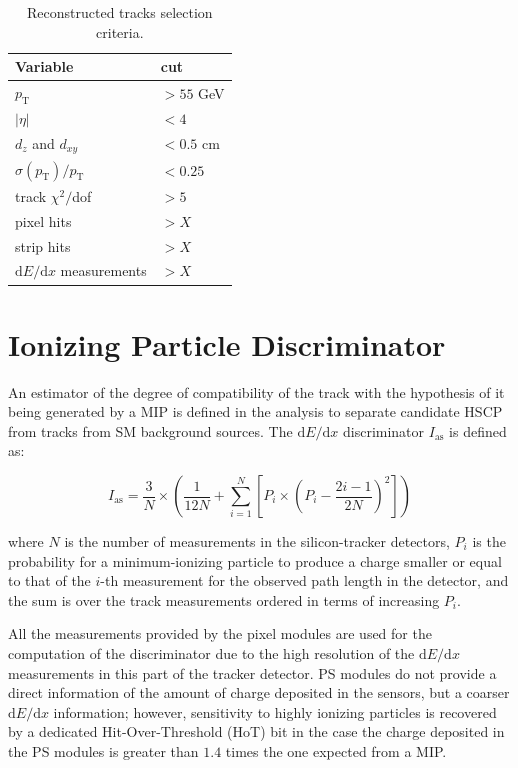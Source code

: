 \documentclass[11pt,oneside,a4paper]{article}
\begin{document}
\begin{table}
 \centering
 \caption{Reconstructed tracks selection criteria.\label{tab:selection}}
 \begin{tabular}{ll}
  \toprule
  Variable 			& cut \\ 
  \midrule	
  $p_{\mathrm{T}}$		& $> 55$ GeV \\
  $|\eta|$			& $< 4$ \\
  $d_z$ and $d_{xy}$		& $< 0.5$ cm \\
  $\sigma(p_{\mathrm{T}})/p_{\mathrm{T}}$		& $< 0.25$ \\
  track $\chi^2/$dof		& $> 5$ \\
  pixel hits			& $> X$ \\
  strip hits			& $> X$ \\
  $\mathrm{d}E/\mathrm{d}x$ measurements			& $> X$ \\
  \bottomrule
 \end{tabular}
\end{table}

\section{Ionizing Particle Discriminator}

An estimator of the degree of compatibility of the track with the hypothesis of it being generated by a MIP is defined in the analysis to separate candidate HSCP from tracks from SM background sources.
The $\mathrm{d}E/\mathrm{d}x$ discriminator $I_{\mathrm{as}}$ is defined as:

$$
I_{\mathrm{as}} = \frac{3}{N} \times \left( \frac{1}{12N} + \sum_{i=1}^{N} \left[ P_i \times \left( P_i - \frac{2i-1}{2N} \right)^2 \right] \right)
$$

where $N$ is the number of measurements in the silicon-tracker detectors, $P_i$ is the probability for a minimum-ionizing particle to produce a charge smaller or equal to that of the $i$-th measurement for the observed path length in the detector, and the sum is over the track measurements ordered in terms of increasing $P_i$.


All the measurements provided by the pixel modules are used for the computation of the discriminator due to the high resolution of the $\mathrm{d}E/\mathrm{d}x$ measurements in this part of the tracker detector.
PS modules do not provide a direct information of the amount of charge deposited in the sensors, but a coarser $\mathrm{d}E/\mathrm{d}x$ information; however, sensitivity to highly ionizing particles is recovered by a dedicated Hit-Over-Threshold (HoT) bit in the case the charge deposited in the PS modules is greater than $1.4$ times the one expected from a MIP.
\end{document}
